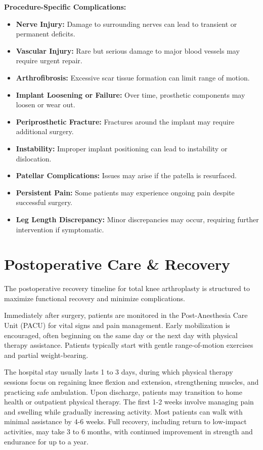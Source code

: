 \textbf{Procedure-Specific Complications:}
\begin{itemize}
  \item \textbf{Nerve Injury:} Damage to surrounding nerves can lead to transient or permanent deficits.
  \item \textbf{Vascular Injury:} Rare but serious damage to major blood vessels may require urgent repair.
  \item \textbf{Arthrofibrosis:} Excessive scar tissue formation can limit range of motion.
  \item \textbf{Implant Loosening or Failure:} Over time, prosthetic components may loosen or wear out.
  \item \textbf{Periprosthetic Fracture:} Fractures around the implant may require additional surgery.
  \item \textbf{Instability:} Improper implant positioning can lead to instability or dislocation.
  \item \textbf{Patellar Complications:} Issues may arise if the patella is resurfaced.
  \item \textbf{Persistent Pain:} Some patients may experience ongoing pain despite successful surgery.
  \item \textbf{Leg Length Discrepancy:} Minor discrepancies may occur, requiring further intervention if symptomatic.
\end{itemize}

\section*{Postoperative Care \& Recovery}
The postoperative recovery timeline for total knee arthroplasty is structured to maximize functional recovery and minimize complications.

Immediately after surgery, patients are monitored in the Post-Anesthesia Care Unit (PACU) for vital signs and pain management. Early mobilization is encouraged, often beginning on the same day or the next day with physical therapy assistance. Patients typically start with gentle range-of-motion exercises and partial weight-bearing.

The hospital stay usually lasts 1 to 3 days, during which physical therapy sessions focus on regaining knee flexion and extension, strengthening muscles, and practicing safe ambulation. Upon discharge, patients may transition to home health or outpatient physical therapy. The first 1-2 weeks involve managing pain and swelling while gradually increasing activity. Most patients can walk with minimal assistance by 4-6 weeks. Full recovery, including return to low-impact activities, may take 3 to 6 months, with continued improvement in strength and endurance for up to a year.

